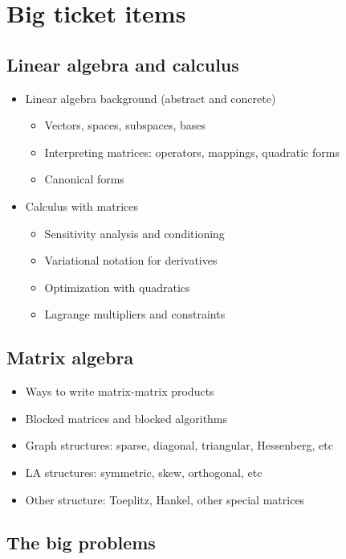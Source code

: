 \documentclass[12pt, leqno]{article} %
\begin{document}

\section{Big ticket items}

\subsection{Linear algebra and calculus}

\begin{itemize}
\item Linear algebra background (abstract and concrete)
  \begin{itemize}
  \item Vectors, spaces, subspaces, bases
  \item Interpreting matrices: operators, mappings, quadratic forms
  \item Canonical forms
  \end{itemize}
\item Calculus with matrices
  \begin{itemize}
  \item Sensitivity analysis and conditioning
  \item Variational notation for derivatives
  \item Optimization with quadratics
  \item Lagrange multipliers and constraints
  \end{itemize}
\end{itemize}

\subsection{Matrix algebra}

\begin{itemize}
\item Ways to write matrix-matrix products
\item Blocked matrices and blocked algorithms
\item Graph structures: sparse, diagonal, triangular, Hessenberg, etc
\item LA structures: symmetric, skew, orthogonal, etc
\item Other structure: Toeplitz, Hankel, other special matrices
\end{itemize}

\subsection{The big problems}
\end{document}
